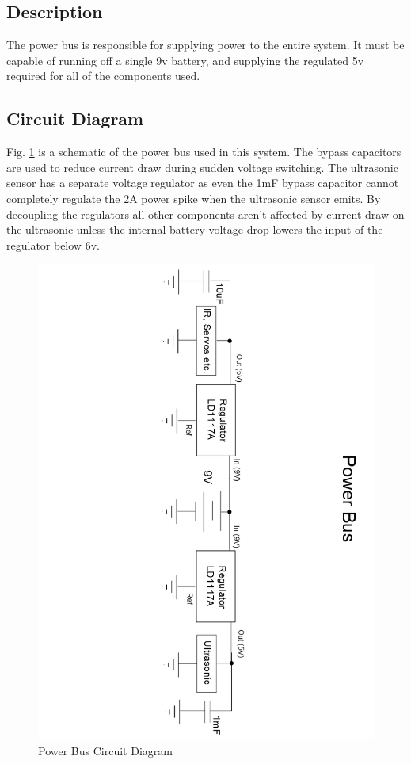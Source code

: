 \documentclass[]{report}
\begin{document}
\subsection{Description}
The power bus is responsible for supplying power to the entire system. It must be capable of running off a single 9v battery, and supplying the regulated 5v required for all of the components used.

\subsection{Circuit Diagram}
Fig. \ref{fig:PowerBus} is a schematic of the power bus used in this system. The bypass capacitors are used to reduce current draw during sudden voltage switching. The ultrasonic sensor has a separate voltage regulator as even the 1mF bypass capacitor cannot completely regulate the 2A power spike when the ultrasonic sensor emits. By decoupling the regulators all other components aren't affected by current draw on the ultrasonic unless the internal battery voltage drop lowers the input of the regulator below 6v.
\begin{figure}
\centering
\includegraphics[width=1.2\linewidth]{"../Diagrams/Power Bus Rotated"}
\caption{Power Bus Circuit Diagram}
\label{fig:PowerBus}
\end{figure}
\end{document}

